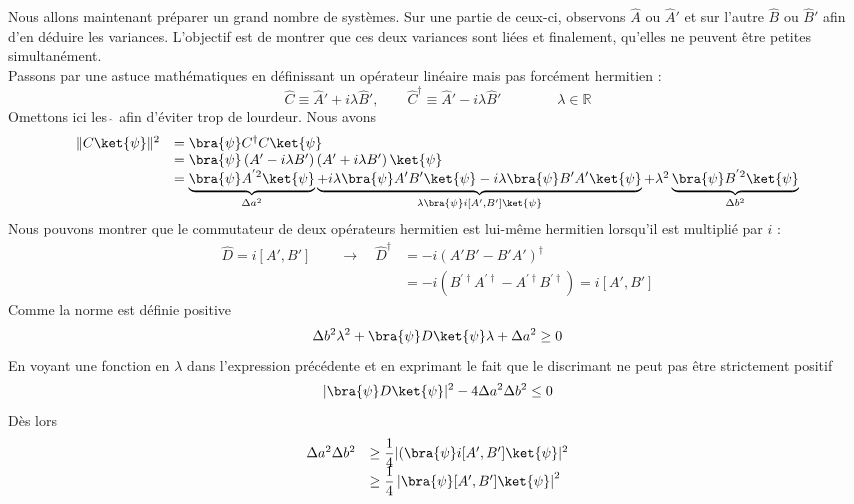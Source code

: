  
 Nous allons maintenant préparer un grand nombre de systèmes. Sur une partie de ceux-ci, 
 observons $\hat{A}$ ou $\hat{A}'$ et sur l'autre $\hat{B}$ ou $\hat{B}'$ afin d'en 
 déduire les variances. L'objectif est de montrer que ces deux variances sont liées et 
 finalement, qu'elles ne peuvent être petites simultanément.\\
 Passons par une astuce mathématiques en définissant un opérateur linéaire mais pas 
 forcément hermitien :
 \begin{equation}
 \hat{C} \equiv \hat{A}' + i\lambda \hat{B}',\qquad
  \hat{C}^\dagger \equiv \hat{A}' - i\lambda \hat{B}'\qquad\qquad\lambda\in\mathbb{R}
 \end{equation}
 Omettons ici les $\hat{\ }$  afin d'éviter trop de lourdeur. Nous avons
 \begin{equation}
 \begin{array}{ll}
 \|C\ket{\psi}\|^2 &= \bra{\psi}C^\dagger C\ket{\psi}\\
 &= \bra{\psi}\left(A'-i\lambda B'\right)\left(A'+i\lambda B'\right)\ket{\psi}\\
 &= \underbrace{\bra{\psi}A^{'2}\ket{\psi}}_{\Delta a^2}\underbrace{+i\lambda\bra{\psi}
 A'B'\ket{\psi}-i\lambda\bra{\psi}B'A'\ket{\psi}}_{\lambda\bra{\psi}i[A',B']\ket{\psi}} 
 + \lambda^2\underbrace{\bra{\psi}B^{'2}\ket{\psi}}_{ \Delta b^2}
 \end{array}
 \end{equation}
 Nous pouvons montrer que le commutateur de deux opérateurs hermitien est lui-même 
 hermitien lorsqu'il est multiplié par $i$ :
 \begin{equation}
 \begin{array}{ll}
 \hat{D} = i[A',B']\qquad \rightarrow\quad \hat{D}^\dagger &=-i(A'B'-B'A')^\dagger\\
 &= -i(B^{'\dagger}A^{'\dagger}-A^{'\dagger}B^{'\dagger}) = i[A',B']
 \end{array}
 \end{equation}
 Comme la norme est définie positive
 \begin{equation}
 \Delta b^2\lambda^2 + \bra{\psi}D\ket{\psi}\lambda + \Delta a^2 \geq 0
 \end{equation}
 En voyant une fonction en $\lambda$ dans l'expression précédente
 et en exprimant le fait que le discrimant ne peut pas être strictement positif
 \begin{equation}
 |\bra{\psi}D\ket{\psi}|^2 - 4\Delta a^2\Delta b^2 \leq 0
 \end{equation}
 Dès lors
 \begin{equation}
 \begin{array}{ll}
 \Delta a^2 \Delta b^2 &\geq \dfrac{1}{4}|(\bra{\psi}i[A',B']\ket{\psi}|^2\\
 &\geq \dfrac{1}{4}\left|\bra{\psi}[A',B']\ket{\psi}\right|^2
 \end{array}
 \end{equation}
